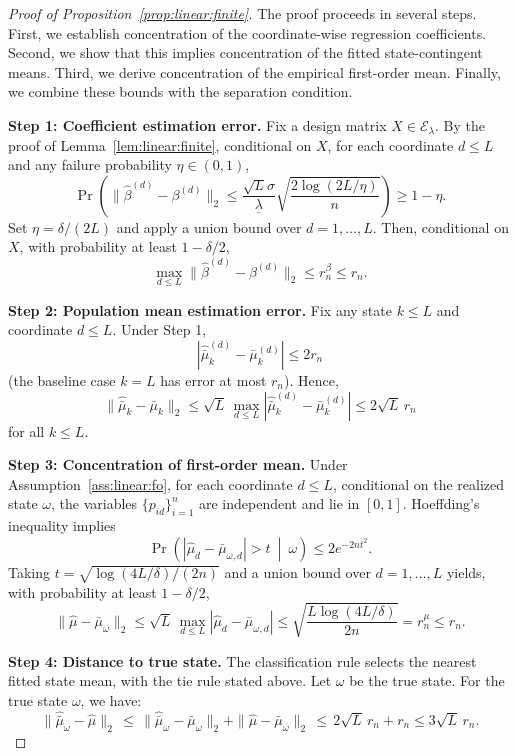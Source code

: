 \documentclass[12pt,reqno]{amsart}
\begin{document}
\begin{proof}[Proof of Proposition~\ref{prop:linear:finite}]\label{app:proof-linear-prop}
    The proof proceeds in several steps. First, we establish concentration of the coordinate-wise regression coefficients. Second, we show that this implies concentration of the fitted state-contingent means. Third, we derive concentration of the empirical first-order mean. Finally, we combine these bounds with the separation condition.

    \textbf{Step 1: Coefficient estimation error.}
    Fix a design matrix $X\in\mathcal{E}_\lambda$. By the proof of Lemma~\ref{lem:linear:finite}, conditional on $X$, for each coordinate $d\le L$ and any failure probability $\eta\in(0,1)$,
    \[
    \Pr\!\left(\|\widehat{\beta}^{(d)}-\beta^{(d)}\|_2
    \le
    \frac{\sqrt{L}\sigma}{\underline\lambda}\sqrt{\frac{2\log(2L/\eta)}{n}}
    \right)\ge 1-\eta.
    \]
    Set $\eta=\delta/(2L)$ and apply a union bound over $d=1,\ldots,L$. Then, conditional on $X$, with probability at least $1-\delta/2$,
    \[
    \max_{d\le L}\|\widehat{\beta}^{(d)}-\beta^{(d)}\|_2\le r_n^\beta\le r_n.
    \]

    \textbf{Step 2: Population mean estimation error.}
    Fix any state $k\le L$ and coordinate $d\le L$. Under Step 1,
    \[
    |\widehat{\bar\mu}^{(d)}_k-\bar\mu^{(d)}_k|
    \le 2r_n
    \]
    (the baseline case $k=L$ has error at most $r_n$). Hence,
    \[
    \|\widehat{\bar\mu}_k-\bar\mu_k\|_2
    \le \sqrt{L}\,\max_{d\le L}|\widehat{\bar\mu}^{(d)}_k-\bar\mu^{(d)}_k|
    \le 2\sqrt{L}\,r_n
    \]
    for all $k\le L$.

    \textbf{Step 3: Concentration of first-order mean.}
    Under Assumption~\ref{ass:linear:fo}, for each coordinate $d\le L$, conditional on the realized state $\omega$, the variables $\{p_{id}\}_{i=1}^n$ are independent and lie in $[0,1]$. Hoeffding's inequality implies
    \[
    \Pr\!\left(\left|\hat\mu_d-\bar\mu_{\omega,d}\right|>t\ \middle|\ \omega\right)
    \le 2e^{-2nt^2}.
    \]
    Taking $t=\sqrt{\log(4L/\delta)/(2n)}$ and a union bound over $d=1,\ldots,L$ yields, with probability at least $1-\delta/2$,
    \[
    \|\hat\mu-\bar\mu_\omega\|_2
    \le
    \sqrt{L}\,\max_{d\le L}\left|\hat\mu_d-\bar\mu_{\omega,d}\right|
    \le
    \sqrt{\frac{L\log(4L/\delta)}{2n}}
    =r_n^\mu\le r_n.
    \]

    \textbf{Step 4: Distance to true state.}
    The classification rule selects the nearest fitted state mean, with the tie rule stated above.
    Let $\omega$ be the true state.
    For the true state $\omega$, we have:
    \[
      \|\widehat{\bar\mu}_\omega-\hat\mu\|_2 \,\le\,
      \|\widehat{\bar\mu}_\omega-\bar\mu_\omega\|_2+\|\hat\mu-\bar\mu_\omega\|_2
      \,\le\, 2\sqrt{L}\,r_n + r_n \le 3\sqrt{L}\,r_n.
    \]


\end{proof}
\end{document}
